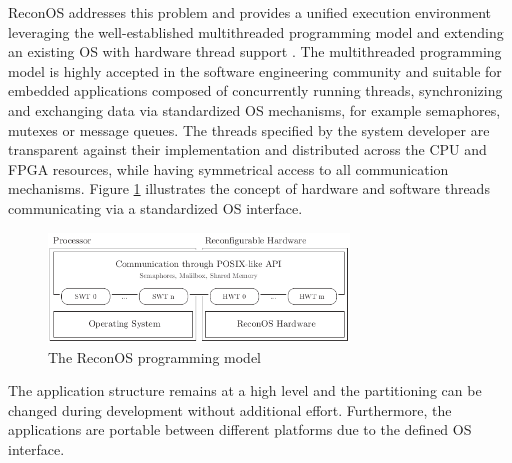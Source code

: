 ReconOS addresses this problem and provides a unified execution environment
leveraging the well-established multithreaded programming model and extending
an existing \ac{OS} with hardware thread support \citep{AHK14}. The
multithreaded programming model is highly accepted in the software engineering
community and suitable for embedded applications \citep{ANA04} composed of
concurrently running threads, synchronizing and exchanging data via
standardized \ac{OS} mechanisms, for example semaphores, mutexes or message
queues. The threads specified by the system developer are transparent against
their implementation and distributed across the \ac{CPU} and \ac{FPGA}
resources, while having symmetrical access to all communication mechanisms.
Figure \ref{fig:reconos_model} illustrates the concept of hardware and
software threads communicating via a standardized \ac{OS} interface.
\begin{figure}[tb]
	\centering
	\includegraphics[width=8cm]{../figures/reconos_model}
	\caption{The ReconOS programming model}
	\label{fig:reconos_model}
\end{figure}
The application structure remains at a high level and the partitioning can be
changed during development without additional effort. Furthermore, the
applications are portable between different platforms due to the defined
\ac{OS} interface.

